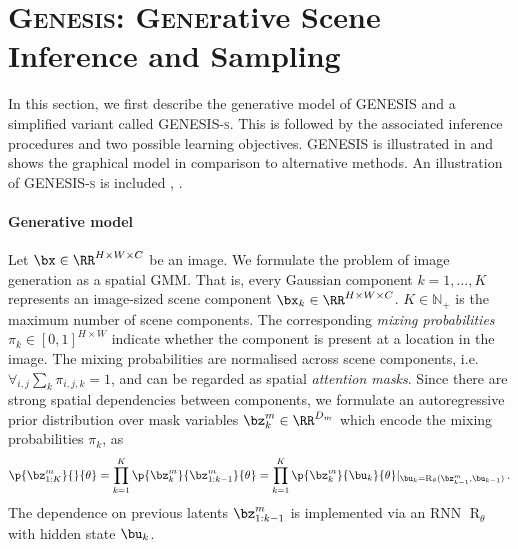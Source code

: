 \documentclass{article}
\begin{document}
 \section{\textsc{Genesis}: \textsc{Gene}rative \textsc{S}cene \textsc{I}nference and \textsc{S}ampling}
\label{sec:compositional}


In this section, we first describe the generative model of \gls{GENESIS} and a simplified variant called \gls{GENESIS}\textsc{-s}.
This is followed by the associated inference procedures and two possible learning objectives.
\gls{GENESIS} is illustrated in  and  shows the graphical model in comparison to alternative methods.
An illustration of \gls{GENESIS}\textsc{-s} is included , .

\paragraph{Generative model}
Let $\bx \in \RR^{H \times W \times C}$ be an image.
We formulate the problem of image generation as a spatial \gls{GMM}.
That is, every Gaussian component $k=1,\dots,K$ represents an image-sized scene component $\bx_k \in \RR^{H \times W \times C}$.
$K \in \mathbb{N}_+$ is the maximum number of scene components.
The corresponding \emph{mixing probabilities} $\pi_k \in [0, 1]^{H \times W}$ indicate whether the component is present at a location in the image.
The mixing probabilities are normalised across scene components, i.e. $\forall_{i,j} \sum_k \pi_{i,j,k} = 1$, and can be regarded as spatial \emph{attention masks}.
Since there are strong spatial dependencies between components, we formulate an autoregressive prior distribution over mask variables $\bz^m_k \in \RR^{D_m}$ which encode the mixing probabilities $\pi_k$, as
\begin{equation}
    \p{\bz_{1:K}^m}{}{\theta}
        = \prod_{k=1}^K \p{\bz^m_k}{\bz^m_{1:k-1}}{\theta}
        = \prod_{k=1}^K \p{\bz^m_k}{\bu_k}{\theta} \lvert_{\bu_k = \operatorname{R}_\theta (\bz^m_{k-1}, \bu_{k-1})}\,.
\end{equation}
The dependence on previous latents $\bz^m_{1:k-1}$ is implemented via an \gls{RNN} $\operatorname{R}_\theta$ with hidden state $\bu_k$.
\end{document}

